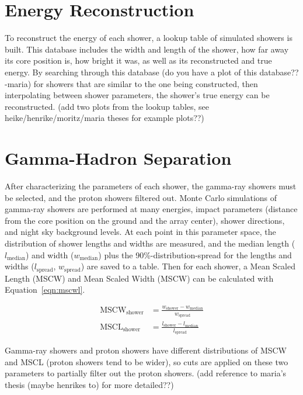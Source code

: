 \section{Energy Reconstruction}\label{subsec:enrecon}
  To reconstruct the energy of each shower, a lookup table of simulated showers is built.
This database includes the width and length of the shower, how far away its core position is, how bright it was, as well as its reconstructed and true energy.
  By searching through this {\color{red}database (do you have a plot of this database?? -maria)} for showers that are similar to the one being constructed, then interpolating between shower parameters, the shower's true energy can be reconstructed.
  {\color{red}(add two plots from the lookup tables, see heike/henrike/moritz/maria theses for example plots??)}

\section{Gamma-Hadron Separation}

After characterizing the parameters of each shower, the gamma-ray showers must be selected, and the proton showers filtered out.
Monte Carlo simulations of gamma-ray showers are performed at many energies, impact parameters (distance from the core position on the ground and the array center), shower directions, and night sky background levels.
At each point in this parameter space, the distribution of shower lengths and widths are measured, and the median length ($l_{\textrm{median}}$) and width ($w_{\textrm{median}}$) plus the 90\%-distribution-spread for the lengths and widths ($l_{\textrm{spread}}$, $w_{\textrm{spread}}$) are saved to a table.
Then for each shower, a Mean Scaled Length (MSCW) and Mean Scaled Width (MSCW) can be calculated with Equation~\ref{eqn:mscwl}.

\begin{equation}\label{eqn:mscwl}
  \begin{split}
    \textrm{MSCW}_{\textrm{shower}} & = \frac{w_{\textrm{shower}}-w_{\textrm{median}}}{w_{\textrm{spread}}} \\
    \textrm{MSCL}_{\textrm{shower}} & = \frac{l_{\textrm{shower}}-l_{\textrm{median}}}{l_{\textrm{spread}}}
  \end{split}
\end{equation}

Gamma-ray showers and proton showers have different distributions of MSCW and MSCL (proton showers tend to be wider), so cuts are applied on these two parameters to partially filter out the proton showers.
{\color{red}(add reference to maria's thesis (maybe henrikes to) for more detailed??)}


